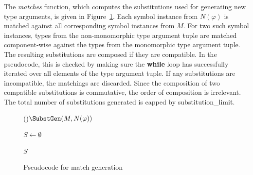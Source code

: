 \documentclass[runningheads]{llncs}
\begin{document}
The \emph{matches} function, which computes the substitutions used for generating new type arguments, is given in Figure~\ref{subst_gen}. Each symbol instance from \(N(\varphi)\) is matched against all corresponding symbol instances from \(M\).
For two such symbol instances, types from the non-monomorphic type argument tuple are matched component-wise against the types from the monomorphic type argument tuple. The resulting substitutions are composed if they are compatible. In the pseudocode, this is checked by making sure the \textbf{while} loop has successfully iterated over all elements of the type argument tuple. If any substitutions are incompatible, the matchings are discarded. Since the composition of two compatible substitutions is commutative, the order of composition is irrelevant. The total number of substitutions generated is capped by \textcolor{ourblueviolet}{substitution\_limit}.

\begin{figure}[t!]
\begin{algorithm}[H]
\Fn(){\(\SubstGen(M, N(\varphi))\)}{

   \BlankLine

   \(S\leftarrow \emptyset\)\;

   \BlankLine


   \BlankLine

   \Return \(S\)\;

}
\end{algorithm}
\caption{Pseudocode for match generation}
\label{subst_gen}
\end{figure}
\end{document}
